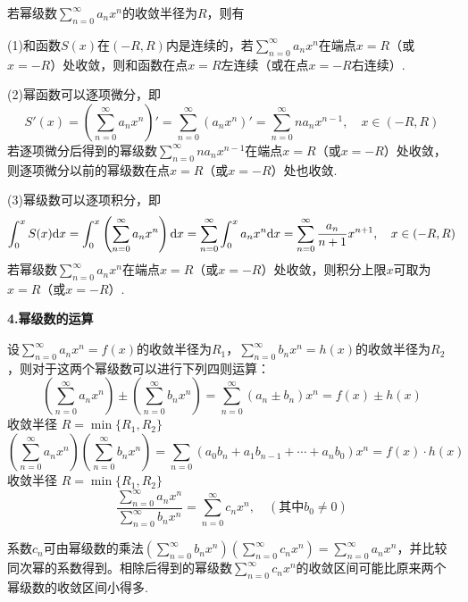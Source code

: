 若幂级数$\displaystyle\sum_{n=0}^\infty a_n x^n$的收敛半径为$R$，则有

(1)和函数$S(x)$在$(-R,R)$内是连续的，若$\displaystyle\sum_{n=0}^\infty a_n x^n$在端点$x=R$（或$x=-R$）处收敛，则和函数在点$x=R$左连续（或在点$x=-R$右连续）.

(2)幂函数可以逐项微分，即
\begin{equation*}
    S'(x)=\left(\sum_{n=0}^\infty a_nx^n\right)'=\sum_{n=0}^\infty \left(a_nx^n\right)'=\sum_{n=0}^\infty na_nx^{n-1}, \quad x\in(-R,R)
\end{equation*}
若逐项微分后得到的幂级数$\displaystyle\sum_{n=0}^\infty na_nx^{n-1}$在端点$x=R$（或$x=-R$）处收敛，则逐项微分以前的幂级数在点$x=R$（或$x=-R$）处也收敛.

(3)幂级数可以逐项积分，即
\begin{equation*}
    \int_0^x S(x)\mathrm{d} x=\int_0^x \left(\sum_{n=0}^\infty a_nx^n\right)\mathrm{d} x=\sum_{n=0}^\infty \int_0^x a_nx^n\mathrm{d} x=\sum_{n=0}^\infty \dfrac{a_n}{n+1}x^{n+1}, \quad x\in(-R,R)
\end{equation*}
若幂级数$\displaystyle\sum_{n=0}^\infty a_nx^n$在端点$x=R$（或$x=-R$）处收敛，则积分上限$x$可取为$x=R$（或$x=-R$）.

\textbf{4.幂级数的运算}

设$\displaystyle\sum_{n=0}^\infty a_nx^n=f(x)$的收敛半径为$R_1$，$\displaystyle\sum_{n=0}^\infty b_nx^n=h(x)$的收敛半径为$R_2$，则对于这两个幂级数可以进行下列四则运算：
\begin{equation*}
    \left(\sum_{n=0}^\infty a_nx^n\right)\pm\left(\sum_{n=0}^\infty b_nx^n\right)=\sum_{n=0}^\infty (a_n\pm b_n)x^n=f(x)\pm h(x)
\end{equation*}
收敛半径 \quad $R=\min\{R_1,R_2\}$
\begin{equation*}
    \left(\sum_{n=0}^\infty a_nx^n\right)\left(\sum_{n=0}^\infty b_nx^n\right)=\sum_{n=0}(a_0b_n+a_1b_{n-1}+\cdots+a_nb_0)x^n=f(x)\cdot h(x)
\end{equation*}
收敛半径 \quad $R=\min\{R_1,R_2\}$
\begin{equation*}
    \dfrac{\displaystyle\sum_{n=0}^\infty a_nx^n}{\displaystyle\sum_{n=0}^\infty b_nx^n}=\sum_{n=0}^\infty c_nx^n, \quad (\mbox{其中}b_0\neq0)
\end{equation*}

系数$c_n$可由幂级数的乘法$\displaystyle\left(\sum_{n=0}^\infty b_nx^n\right)\left(\sum_{n=0}^\infty c_nx^n\right)=\sum_{n=0}^\infty a_nx^n$，并比较同次幂的系数得到。相除后得到的幂级数$\displaystyle\sum_{n=0}^\infty c_nx^n$的收敛区间可能比原来两个幂级数的收敛区间小得多.

